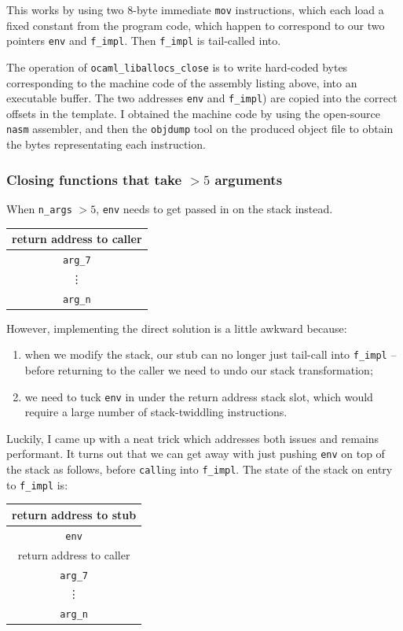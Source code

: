 \documentclass[12pt,a4paper,twoside,openright]{report}
\begin{document}
This works by using two 8-byte immediate \lstinline!mov! instructions, which
each load a fixed constant from the program code, which happen to correspond to
our two pointers \lstinline!env! and \lstinline!f_impl!.
Then \lstinline!f_impl! is tail-called into.

The operation of \lstinline!ocaml_liballocs_close! is to write hard-coded bytes
corresponding to the machine code of the assembly listing above, into an
executable buffer. The two addresses \lstinline!env! and \lstinline!f_impl!)
are copied into the correct offsets in the template. I obtained the machine
code by using the open-source \lstinline!nasm! assembler, and then the
\lstinline!objdump! tool on the produced object file to obtain the bytes
representating each instruction.

\subsubsection{Closing functions that take $> 5$ arguments}

When \lstinline!n_args! $> 5$, \lstinline!env! needs to get passed in on the
stack instead.

\begin{tabular}{c}
  return address to caller
  \\ \hline\hline
  \lstinline!arg_7!
  \\ \hline
  \vdots
  \\ \hline
  \lstinline!arg_n!
\end{tabular}

However, implementing the direct solution is a little awkward because:
\begin{enumerate}
  \item when we modify the stack, our stub can no longer just tail-call
    into \lstinline!f_impl! -- before returning to the caller we need to undo
    our stack transformation;
  \item we need to tuck \lstinline!env! in under the return address
    stack slot, which would require a large number of stack-twiddling
    instructions.
\end{enumerate}

Luckily, I came up with a neat trick which addresses both issues and remains
performant. It turns out that we can get away with just pushing \lstinline!env!
on top of the stack as follows, before \lstinline!call!ing into
\lstinline!f_impl!. The state of the stack on entry to \lstinline!f_impl! is:

\begin{tabular}{c}
  return address to stub
  \\ \hline\hline
  \lstinline!env!
  \\ \hline
  return address to caller
  \\ \hline
  \lstinline!arg_7!
  \\ \hline
  \vdots
  \\ \hline
  \lstinline!arg_n!
\end{tabular}
\end{document}
